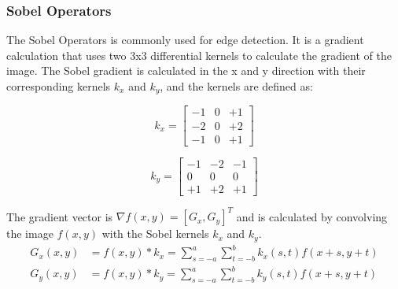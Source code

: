 \subsubsection{Sobel Operators}
The Sobel Operators \cite{gonzalez_sharpening_nodate} is commonly used for edge detection. It is a gradient calculation that uses two 3x3 differential kernels to calculate the gradient of the image. The Sobel gradient is calculated in the x and y direction with their corresponding kernels $k_x$ and $k_y$, and the kernels are defined as:
\begin{center}
    \begin{minipage}{0.44\textwidth}
        \begin{equation}
            k_x = \begin{bmatrix}
                -1 & 0 & +1 \\
                -2 & 0 & +2 \\
                -1 & 0 & +1
            \end{bmatrix} 
        \end{equation}
    \end{minipage}
    \hfill
    \begin{minipage}{0.44\textwidth}
        \begin{equation}
            k_y = \begin{bmatrix}
                -1 & -2 & -1 \\
                0 & 0 & 0 \\
                +1 & +2 & +1
            \end{bmatrix} 
        \end{equation}
         
    \end{minipage}
    
\end{center}
     The gradient vector is $\nabla f(x,y) = [G_x, G_y]^T$  and is calculated by convolving the image $f(x,y)$ with the Sobel kernels $k_x$ and $k_y$.
     \begin{align}
        G_x(x,y) & = f(x,y) * k_x  = \sum_{s=-a}^{a} \sum_{t=-b}^{b} k_x(s,t) f(x+s,y+t) \\
        G_y(x,y) & = f(x,y) * k_y  = \sum_{s=-a}^{a} \sum_{t=-b}^{b} k_y(s,t) f(x+s,y+t)
    \end{align}
     
